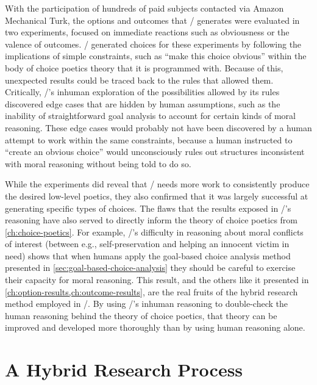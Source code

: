 With the participation of hundreds of paid subjects contacted via Amazon Mechanical Turk, the options and outcomes that \dunyazad/ generates were evaluated in two experiments, focused on immediate reactions such as obviousness or the valence of outcomes.
%
\dunyazad/ generated choices for these experiments by following the implications of simple constraints, such as ``make this choice obvious'' within the body of choice poetics theory that it is programmed with.
%
Because of this, unexpected results could be traced back to the rules that allowed them.
%
Critically, \dunyazad/'s inhuman exploration of the possibilities allowed by its rules discovered edge cases that are hidden by human assumptions, such as the inability of straightforward goal analysis to account for certain kinds of moral reasoning.
%
These edge cases would probably not have been discovered by a human attempt to work within the same constraints, because a human instructed to ``create an obvious choice'' would unconsciously rules out structures inconsistent with moral reasoning without being told to do so.


While the experiments did reveal that \dunyazad/ needs more work to consistently produce the desired low-level poetics, they also confirmed that it was largely successful at generating specific types of choices.
%
The flaws that the results exposed in \dunyazad/'s reasoning have also served to directly inform the theory of choice poetics from \cref{ch:choice-poetics}.
%
For example, \dunyazad/'s difficulty in reasoning about moral conflicts of interest (between e.g., self-preservation and helping an innocent victim in need) shows that when humans apply the goal-based choice analysis method presented in \cref{sec:goal-based-choice-analysis} they should be careful to exercise their capacity for moral reasoning.
%
This result, and the others like it presented in \cref{ch:option-results,ch:outcome-results}, are the real fruits of the hybrid research method employed in \dunyazad/.
%
By using \dunyazad/'s inhuman reasoning to double-check the human reasoning behind the theory of choice poetics, that theory can be improved and developed more thoroughly than by using human reasoning alone.


\section{A Hybrid Research Process}


